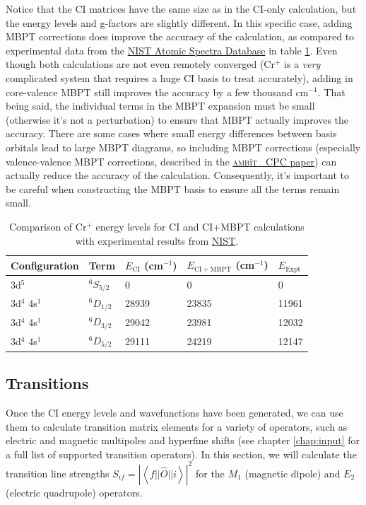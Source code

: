 \documentclass{report}
\newcommand{\ambit}{\textsc{amb}{\footnotesize i}\textsc{t}}
\begin{document}
Notice that the CI matrices have the same size as in the CI-only calculation, but the energy levels and
g-factors are slightly different. In this specific case, adding MBPT corrections does improve the
accuracy of the calculation, as compared to experimental data from the 
\href{https://physics.nist.gov/PhysRefData/ASD/levels_form.html}{NIST Atomic Spectra Database} in table
\ref{tab:CI_MBPT_comparison}. Even though both calculations are not even remotely converged (Cr$^+$ is a
\emph{very} complicated system that requires a huge CI basis to treat accurately), adding in
core-valence MBPT still improves the accuracy by a few thousand cm$^{-1}$. That being said, the
individual terms in the MBPT expansion must be small (otherwise it's not a perturbation) to ensure that
MBPT actually improves the accuracy. There are some cases where small energy differences between
basis orbitals lead to large MBPT diagrams, so including MBPT corrections (especially
valence-valence MBPT corrections, described in the \href{link_goes_here}{\ambit~ CPC paper}) can
actually reduce the accuracy of the calculation. Consequently, it's important to be careful when 
constructing the MBPT basis to ensure all the terms remain small.

\begin{table}
\label{tab:CI_MBPT_comparison}
\caption{Comparison of Cr$^+$ energy levels for CI and CI+MBPT calculations with experimental results
from \href{https://physics.nist.gov/PhysRefData/ASD/levels_form.html}{NIST}.}
\begin{tabular}{l  l  l  l  l}
\hline
Configuration   &Term    &$E_{\mathrm{CI}}$ (cm$^{-1}$)     &$E_{\mathrm{CI+MBPT}}$ (cm$^{-1}$)  & $E_{\mathrm{Expt}}$\\
\hline
\hline
3d$^5$  &$^6S_{5/2}$    &0  &0  &0\\
3d$^4$ 4s$^1$   &$^6D_{1/2}$    &28939  &23835  &11961\\
3d$^4$ 4s$^1$   &$^6D_{3/2}$    &29042  &23981  &12032\\
3d$^4$ 4s$^1$   &$^6D_{5/2}$    &29111  &24219  &12147\\
\hline
\end{tabular}
\end{table}


\subsection{Transitions}

Once the CI energy levels and wavefunctions have been generated, we can use them to calculate transition
matrix elements for a variety of operators, such as electric and magnetic multipoles and hyperfine
shifts (see chapter \ref{chap:input} for a full list of supported transition operators). In this 
section, we will calculate the transition line strengths $S_{if} =
\left|\left<f||\hat{O}||i\right>\right|^2$ for 
the $M_1$ (magnetic dipole) and $E_2$ (electric quadrupole) operators.
\end{document}
